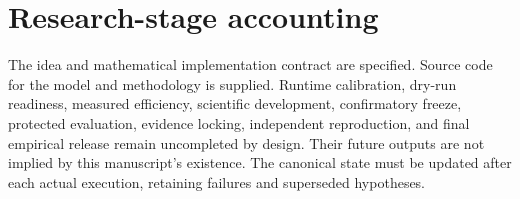 \documentclass[11pt,a4paper]{article}
\begin{document}
\section{Research-stage accounting}
The idea and mathematical implementation contract are specified. Source code for the model and methodology is supplied. Runtime calibration, dry-run readiness, measured efficiency, scientific development, confirmatory freeze, protected evaluation, evidence locking, independent reproduction, and final empirical release remain uncompleted by design. Their future outputs are not implied by this manuscript's existence. The canonical state must be updated after each actual execution, retaining failures and superseded hypotheses.



\end{document}
